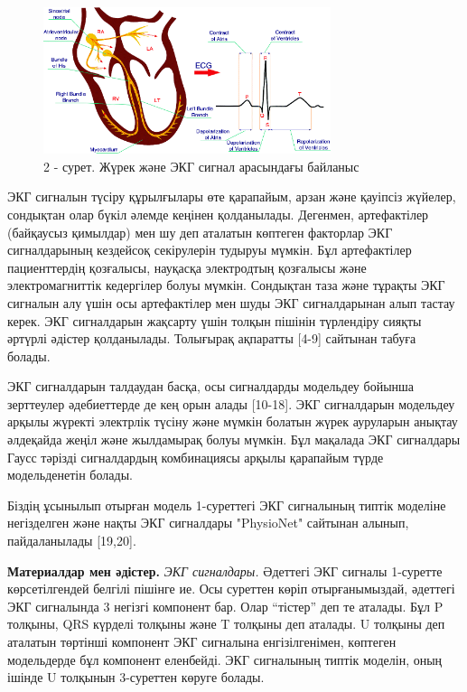 \begin{figure}[H]
	\centering
	\includegraphics[width=0.75\textwidth]{media/ict/image41}
	\caption*{2 - сурет. Жүрек және ЭКГ сигнал арасындағы байланыс}
\end{figure}

\begin{multicols}{2}
ЭКГ сигналын түсіру құрылғылары өте қарапайым, арзан және қауіпсіз
жүйелер, сондықтан олар бүкіл әлемде кеңінен қолданылады. Дегенмен,
артефактілер (байқаусыз қимылдар) мен шу деп аталатын көптеген факторлар
ЭКГ сигналдарының кездейсоқ секірулерін тудыруы мүмкін. Бұл артефактілер
пациенттердің қозғалысы, науқасқа электродтың қозғалысы және
электромагниттік кедергілер болуы мүмкін. Сондықтан таза және тұрақты
ЭКГ сигналын алу үшін осы артефактілер мен шуды ЭКГ сигналдарынан алып
тастау керек. ЭКГ сигналдарын жақсарту үшін толқын пішінін түрлендіру
сияқты әртүрлі әдістер қолданылады. Толығырақ ақпаратты {[}4-9{]}
сайтынан табуға болады.

ЭКГ сигналдарын талдаудан басқа, осы сигналдарды модельдеу бойынша
зерттеулер әдебиеттерде де кең орын алады {[}10-18{]}. ЭКГ сигналдарын
модельдеу арқылы жүректі электрлік түсіну және мүмкін болатын жүрек
ауруларын анықтау әлдеқайда жеңіл және жылдамырақ болуы мүмкін. Бұл
мақалада ЭКГ сигналдары Гаусс тәрізді сигналдардың комбинациясы арқылы
қарапайым түрде модельденетін болады.

Біздің ұсынылып отырған модель 1-суреттегі ЭКГ сигналының типтік
моделіне негізделген және нақты ЭКГ сигналдары "PhysioNet" сайтынан
алынып, пайдаланылады {[}19,20{]}.

{\bfseries Материалдар мен әдістер.} \emph{ЭКГ сигналдары.} Әдеттегі ЭКГ
сигналы 1-суретте көрсетілгендей белгілі пішінге ие. Осы суреттен көріп
отырғанымыздай, әдеттегі ЭКГ сигналында 3 негізгі компонент бар. Олар
``тістер'' деп те аталады. Бұл P толқыны, QRS күрделі толқыны және T
толқыны деп аталады. U толқыны деп аталатын төртінші компонент ЭКГ
сигналына енгізілгенімен, көптеген модельдерде бұл компонент еленбейді.
ЭКГ сигналының типтік моделін, оның ішінде U толқынын 3-суреттен көруге
болады.
\end{multicols}

